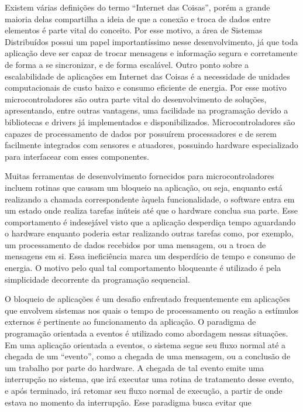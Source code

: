 \documentclass{article}
\begin{document}
\tab Existem várias definições do termo “Internet das
Coisas”, porém a grande maioria delas compartilha a ideia de que a conexão e troca de dados
entre elementos é parte vital do conceito. Por esse motivo, a área de Sistemas Distribuídos possui um
papel importantíssimo nesse desenvolvimento, já que toda aplicação deve ser capaz de trocar
mensagens e informação segura e corretamente de forma a se sincronizar, e de forma escalável. \cite{singh2014}
Outro ponto sobre a escalabilidade de aplicações em Internet das Coisas é a necessidade de unidades
computacionais de custo baixo e consumo eficiente de energia. Por esse motivo microcontroladores
são outra parte vital do desenvolvimento de soluções, apresentando, entre outras vantagens, uma
facilidade na programação devido a bibliotecas e drivers já implementados e disponibilizados.
Microcontroladores são capazes de processamento de dados por possuírem processadores e de
serem facilmente integrados com sensores e atuadores, possuindo hardware especializado para
interfacear com esses componentes.
\par Muitas ferramentas de desenvolvimento fornecidos para microcontroladores incluem rotinas que causam um bloqueio na
aplicação, ou seja, enquanto está realizando a chamada correspondente àquela funcionalidade, o
software entra em um estado onde realiza tarefas inúteis até que o hardware conclua sua
parte. Esse comportamento é indesejável visto que a aplicação desperdiça tempo aguardando o
hardware enquanto poderia estar realizando outras tarefas como, por exemplo, um processamento de
dados recebidos por uma mensagem, ou a troca de mensagens em si. Essa ineficiência marca um
desperdício de tempo e consumo de energia. O motivo pelo qual tal comportamento bloqueante é utilizado é pela simplicidade decorrente da programação sequencial.
\par O bloqueio de aplicações é um desafio enfrentado frequentemente em aplicações que envolvem
sistemas nos quais o tempo de processamento ou reação a estímulos externos é pertinente ao
funcionamento da aplicação. O paradigma de programação orientada a eventos é utilizado como abordagem nessas situações. Em uma aplicação orientada a eventos, o sistema segue
seu fluxo normal até a chegada de um “evento”, como a chegada de uma mensagem, ou a conclusão
de um trabalho por parte do hardware. A chegada de tal evento emite uma interrupção no sistema, que
irá executar uma rotina de tratamento desse evento, e após terminado, irá retomar seu fluxo normal
de execução, a partir de onde estava no momento da interrupção. Esse paradigma busca evitar que
\end{document}
